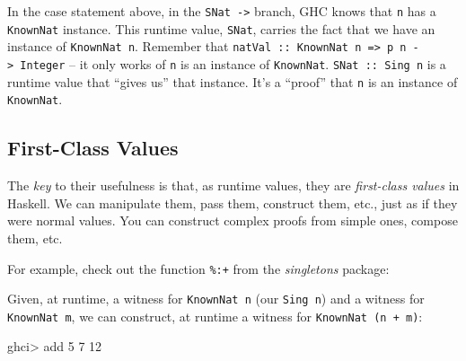 \documentclass[]{article}
\newenvironment{Shaded}{}{}
\newcommand{\CommentTok}[1]{\textcolor[rgb]{0.38,0.63,0.69}{\textit{#1}}}
\newcommand{\DataTypeTok}[1]{\textcolor[rgb]{0.56,0.13,0.00}{#1}}
\newcommand{\DecValTok}[1]{\textcolor[rgb]{0.25,0.63,0.44}{#1}}
\newcommand{\FunctionTok}[1]{\textcolor[rgb]{0.02,0.16,0.49}{#1}}
\newcommand{\KeywordTok}[1]{\textcolor[rgb]{0.00,0.44,0.13}{\textbf{#1}}}
\newcommand{\NormalTok}[1]{#1}
\newcommand{\OtherTok}[1]{\textcolor[rgb]{0.00,0.44,0.13}{#1}}
\begin{document}
In the case statement above, in the \texttt{SNat\ -\textgreater{}} branch, GHC
knows that \texttt{n} has a \texttt{KnownNat} instance. This runtime value,
\texttt{SNat}, carries the fact that we have an instance of
\texttt{KnownNat\ n}. Remember that
\texttt{natVal\ ::\ KnownNat\ n\ =\textgreater{}\ p\ n\ -\textgreater{}\ Integer}
-- it only works of \texttt{n} is an instance of \texttt{KnownNat}.
\texttt{SNat\ ::\ Sing\ n} is a runtime value that ``gives us'' that instance.
It's a ``proof'' that \texttt{n} is an instance of \texttt{KnownNat}.

\hypertarget{first-class-values}{%
\subsection{First-Class Values}\label{first-class-values}}

The \emph{key} to their usefulness is that, as runtime values, they are
\emph{first-class values} in Haskell. We can manipulate them, pass them,
construct them, etc., just as if they were normal values. You can construct
complex proofs from simple ones, compose them, etc.

For example, check out the function \texttt{\%:+} from the \emph{singletons}
package:

\begin{Shaded}
\begin{Highlighting}[]
\OtherTok{(%:+) ::}\NormalTok{ forall (}\OtherTok{n ::} \DataTypeTok{Nat}\NormalTok{) (}\OtherTok{m ::} \DataTypeTok{Nat}\NormalTok{)}\FunctionTok{.} \DataTypeTok{Sing}\NormalTok{ n }\OtherTok{->} \DataTypeTok{Sing}\NormalTok{ m }\OtherTok{->} \DataTypeTok{Sing}\NormalTok{ (n }\FunctionTok{+}\NormalTok{ m)}
\end{Highlighting}
\end{Shaded}

Given, at runtime, a witness for \texttt{KnownNat\ n} (our \texttt{Sing\ n}) and
a witness for \texttt{KnownNat\ m}, we can construct, at runtime a witness for
\texttt{KnownNat\ (n\ +\ m)}:

\begin{Shaded}
\end{Shaded}

\begin{Shaded}
\begin{Highlighting}[]
\NormalTok{ghci}\FunctionTok{>}\NormalTok{ add }\DecValTok{5} \DecValTok{7}
\DecValTok{12}
\end{Highlighting}
\end{Shaded}
\end{document}

